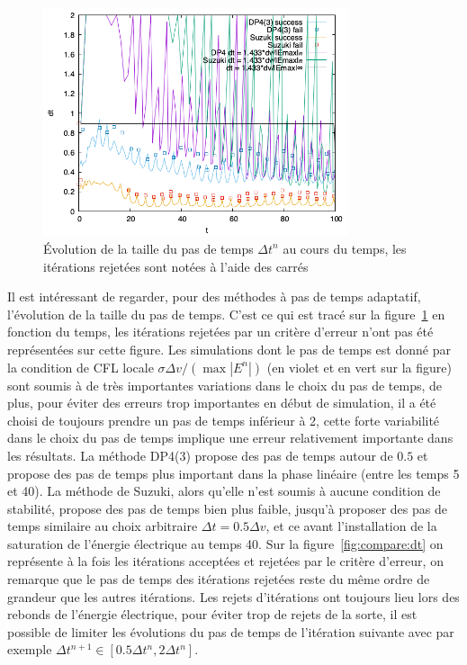 \begin{figure}[h]
  \centering
  \includegraphics[width=0.8\textwidth]{img/compare_dt_cfl.png}
  \caption{Évolution de la taille du pas de temps $\Delta t^n$ au cours du temps, les itérations rejetées sont notées à l'aide des carrés}
  \label{fig:compare:dt:all}
\end{figure}

Il est intéressant de regarder, pour des méthodes à pas de temps adaptatif, l'évolution de la taille du pas de temps. C'est ce qui est tracé sur la figure~\ref{fig:compare:dt:all} en fonction du temps, les itérations rejetées par un critère d'erreur n'ont pas été représentées sur cette figure. Les simulations dont le pas de temps est donné par la condition de CFL locale $\sigma \Delta v/(\max |E^n|)$ (en violet et en vert sur la figure) sont soumis à de très importantes variations dans le choix du pas de temps, de plus, pour éviter des erreurs trop importantes en début de simulation, il a été choisi de toujours prendre un pas de temps inférieur à 2, cette forte variabilité dans le choix du pas de temps implique une erreur relativement importante dans les résultats. La méthode DP4(3) propose des pas de temps autour de $0.5$ et propose des pas de temps plus important dans la phase linéaire (entre les temps 5 et 40). La méthode de Suzuki, alors qu'elle n'est soumis à aucune condition de stabilité, propose des pas de temps bien plus faible, jusqu'à proposer des pas de temps similaire au choix arbitraire $\Delta t = 0.5\Delta v$, et ce avant l'installation de la saturation de l'énergie électrique au temps 40. Sur la figure~\ref{fig:compare:dt} on représente à la fois les itérations acceptées et rejetées par le critère d'erreur, on remarque que le pas de temps des itérations rejetées reste du même ordre de grandeur que les autres itérations. Les rejets d'itérations ont toujours lieu lors des rebonds de l'énergie électrique, pour éviter trop de rejets de la sorte, il est possible de limiter les évolutions du pas de temps de l'itération suivante avec par exemple $\Delta t^{n+1} \in [0.5\Delta t^n,2\Delta t^n]$. 


